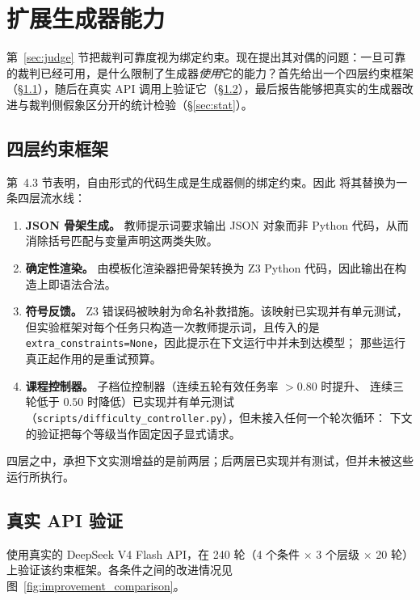 \section{扩展生成器能力}

第~\ref{sec:judge} 节把裁判可靠度视为绑定约束。现在提出其对偶的问题：一旦可靠的裁判已经可用，是什么限制了生成器\emph{使用}它的能力？首先给出一个四层约束框架（\S\ref{sec:fourlayer}），随后在真实 API 调用上验证它（\S\ref{sec:api}），最后报告能够把真实的生成器改进与裁判侧假象区分开的统计检验（\S\ref{sec:stat}）。

\subsection{四层约束框架}
\label{sec:fourlayer}

第~4.3 节表明，自由形式的代码生成是生成器侧的绑定约束。因此
将其替换为一条四层流水线：

\begin{enumerate}
  \item \textbf{JSON 骨架生成。} 教师提示词要求输出 JSON 对象而非
        Python 代码，从而消除括号匹配与变量声明这两类失败。
  \item \textbf{确定性渲染。} 由模板化渲染器把骨架转换为 Z3 Python
        代码，因此输出在构造上即语法合法。
  \item \textbf{符号反馈。} Z3 错误码被映射为命名补救措施。该映射已实现并有单元测试，
        但实验框架对每个任务只构造一次教师提示词，且传入的是
        \texttt{extra\_constraints=None}，因此提示在下文运行中并未到达模型；
        那些运行真正起作用的是重试预算。
  \item \textbf{课程控制器。} 子档位控制器（连续五轮有效任务率 $> 0.80$ 时提升、
        连续三轮低于 $0.50$ 时降低）已实现并有单元测试
        （\texttt{scripts/difficulty\_controller.py}），但未接入任何一个轮次循环：
        下文的验证把每个等级当作固定因子显式请求。
\end{enumerate}

四层之中，承担下文实测增益的是前两层；后两层已实现并有测试，但并未被这些运行所执行。

\subsection{真实 API 验证}
\label{sec:api}

使用真实的 DeepSeek V4 Flash API，在 240 轮（4 个条件 $\times$ 3 个层级 $\times$ 20 轮）
上验证该约束框架。各条件之间的改进情况见
图~\ref{fig:improvement_comparison}。

